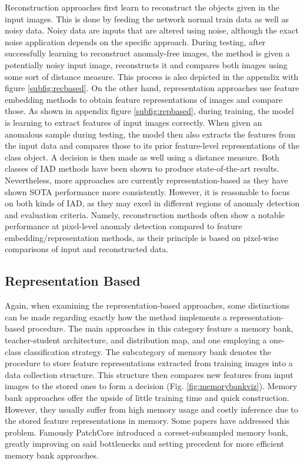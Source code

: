 Reconstruction approaches first learn to reconstruct the objects given in the input images. This is done by feeding the network normal train data as well as noisy data. Noisy data are inputs
that are altered using noise, although the exact noise application depends on the specific approach. During testing, after successfully learning to 
reconstruct anomaly-free images, the method is given a potentially noisy input image, reconstructs it and compares both images using some sort of distance measure. This process is also depicted in the appendix with figure \ref{subfig:recbased}. 
On the other hand, representation approaches use feature embedding methods to obtain feature representations of images and compare those. As shown in appendix figure \ref{subfig:repbased}, during training, the model is 
learning to extract features of input images correctly. When given an anomalous sample during testing, the model then also extracts the features from the input data and compares those to its 
prior feature-level representations of the class object. A decision is then made as well using a distance measure.\newline
Both classes of IAD methods have been shown to produce state-of-the-art results. Nevertheless, more approaches are currently representation-based \cite{liu2024deep} as they have shown SOTA performance more 
consistently. However, it is reasonable to focus on both kinds of IAD, as they may excel in different regions of anomaly detection and evaluation criteria. Namely, reconstruction methods often show a notable performance at pixel-level anomaly detection compared to feature embedding/representation methods, as their principle is based on pixel-wise comparisons of input 
and reconstructed data.

\subsection{Representation Based}

Again, when examining the representation-based approaches, some distinctions can be made regarding exactly how the method implements a representation-based procedure.
The main approaches in this category feature a memory bank, teacher-student architecture, and distribution map, and one employing a one-class classification strategy. The subcategory of 
memory bank denotes the procedure to store feature representations extracted from training images into a data collection structure. This structure then compares new 
features from input images to the stored ones to form a decision (Fig. \ref{fig:memorybankviz}). Memory bank approaches offer the upside of little training time and quick construction. However, they usually suffer from high memory 
usage and costly inference due to the stored feature representations in memory. Some papers have addressed this problem. Famously PatchCore \cite{patchCore2022} introduced a coreset-subsampled 
memory bank, greatly improving on said bottlenecks and setting precedent for more efficient memory bank approaches. \newline

